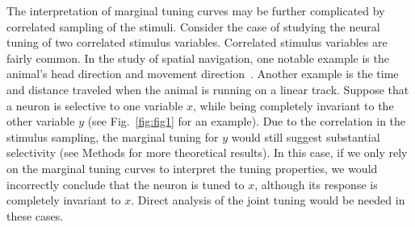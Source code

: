 \documentclass[11pt]{article}
\begin{document}


The interpretation of marginal tuning curves may be further complicated by correlated sampling of the stimuli. Consider the case of studying the neural tuning of two correlated stimulus variables. Correlated stimulus variables are fairly common. In the study of spatial navigation, one notable example is the animal's head direction and movement direction~\cite{Raudies2015head}. Another example is the time and distance traveled when the animal is running on a linear track. Suppose that a neuron is selective to one variable $x$, while being completely invariant to the other variable $y$ (see Fig.~\ref{fig:fig1} for an example).  Due to the correlation in the stimulus sampling, the marginal tuning for $y$ would still suggest substantial selectivity (see Methods for more theoretical results).  In this case, if we only rely on the marginal tuning curves to interpret the tuning properties, we would incorrectly conclude that the neuron is tuned to $x$, although its response is completely invariant to $x$. Direct analysis of the joint tuning would be needed in these cases.






\end{document}
